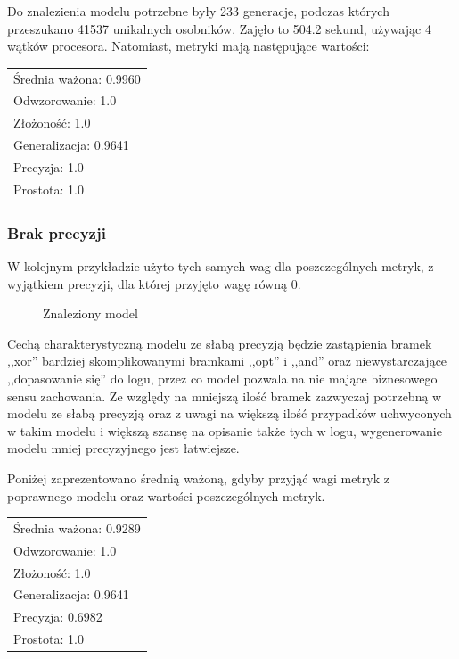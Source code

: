 Do znalezienia modelu potrzebne były 233 generacje, podczas których przeszukano 41537 unikalnych osobników. Zajęło to 504.2 sekund, używając 4 wątków procesora. Natomiast, metryki mają następujące wartości: 

 \begin{center}
  \begin{tabular}{l}
	Średnia ważona: 0.9960 \\
	Odwzorowanie: 1.0 \\
	Złożoność: 1.0 \\
	Generalizacja: 0.9641 \\
	Precyzja: 1.0 \\
	Prostota: 1.0
  \end{tabular}
 \end{center}

\subsubsection{Brak precyzji}
W kolejnym przykładzie użyto tych samych wag dla poszczególnych metryk, z wyjątkiem precyzji, dla której przyjęto wagę równą 0.
\begin{figure}[!ht]
	\caption{\label{fig:v8a7c1254l5.csv_21_4_13_211038_8672_3/graphviz}Znaleziony model}
\end{figure}

Cechą charakterystyczną modelu ze słabą precyzją będzie zastąpienia bramek ,,xor'' bardziej skomplikowanymi bramkami ,,opt'' i ,,and'' oraz niewystarczające ,,dopasowanie się'' do logu, przez co model pozwala na nie mające biznesowego sensu zachowania. Ze względy na mniejszą ilość bramek zazwyczaj potrzebną w modelu ze słabą precyzją oraz z uwagi na większą ilość przypadków uchwyconych w takim modelu i większą szansę na opisanie także tych w logu, wygenerowanie modelu mniej precyzyjnego jest łatwiejsze.
 
Poniżej zaprezentowano średnią ważoną, gdyby przyjąć wagi metryk z poprawnego modelu oraz wartości poszczególnych metryk. 
 \begin{center}
  \begin{tabular}{l}
	Średnia ważona: 0.9289 \\
	Odwzorowanie: 1.0 \\
	Złożoność: 1.0 \\
	Generalizacja: 0.9641 \\
	Precyzja: 0.6982 \\
	Prostota: 1.0
  \end{tabular}
 \end{center}
 
